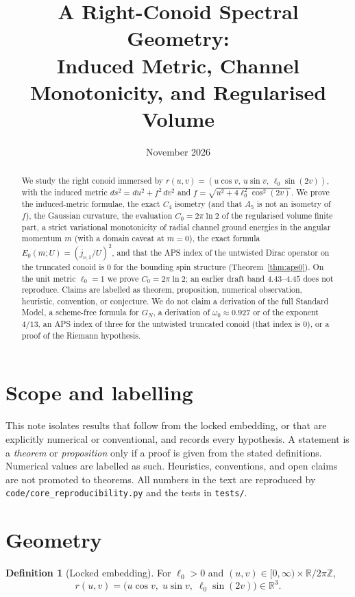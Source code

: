 \documentclass[11pt,a4paper]{article}
\title{A Right-Conoid Spectral Geometry:\\Induced Metric, Channel Monotonicity, and Regularised Volume}
\author{}
\date{November 2026}
\theoremstyle{definition}
\newtheorem{definition}[theorem]{Definition}
\theoremstyle{remark}
\begin{document}
\maketitle

\begin{abstract}
We study the right conoid immersed by
$r(u,v)=(u\cos v,\,u\sin v,\,\ell_0\sin(2v))$, with the induced metric
$ds^2=du^2+f^2\,dv^2$ and $f=\sqrt{u^2+4\ell_0^2\cos^2(2v)}$.
We prove the induced-metric formulae, the exact $C_4$ isometry
(and that $A_5$ is not an isometry of $f$), the Gaussian curvature,
the evaluation $C_0=2\pi\ln 2$ of the regularised volume finite part,
a strict variational monotonicity of radial channel ground energies in
the angular momentum $m$ (with a domain caveat at $m=0$), the exact
formula $E_0(m;U)=(j_{\nu,1}/U)^2$, and that the APS index of the
untwisted Dirac operator on the truncated conoid is $0$ for the
bounding spin structure (Theorem~\ref{thm:aps0}).
On the unit metric $\ell_0=1$ we prove $C_0=2\pi\ln 2$; an earlier draft band $4.43$--$4.45$ does not reproduce.
Claims are labelled as theorem, proposition, numerical observation,
heuristic, convention, or conjecture. We do not claim a derivation of
the full Standard Model, a scheme-free formula for $G_N$, a derivation
of $\omega_0\approx 0.927$ or of the exponent $4/13$, an APS index of
three for the untwisted truncated conoid (that index is $0$), or a
proof of the Riemann hypothesis.
\end{abstract}

\section{Scope and labelling}

This note isolates results that follow from the locked embedding, or
that are explicitly numerical or conventional, and records every
hypothesis. A statement is a \emph{theorem} or \emph{proposition} only
if a proof is given from the stated definitions. Numerical values are
labelled as such. Heuristics, conventions, and open claims are not
promoted to theorems. All numbers in the text are reproduced by
\texttt{code/core\_reproducibility.py} and the tests in \texttt{tests/}.

\section{Geometry}

\begin{definition}[Locked embedding]
\label{def:embedding}
For $\ell_0>0$ and $(u,v)\in[0,\infty)\times\mathbb{R}/2\pi\mathbb{Z}$,
\[
  r(u,v)=\bigl(u\cos v,\; u\sin v,\; \ell_0\sin(2v)\bigr)\in\mathbb{R}^3.
\]
\end{definition}
\end{document}
